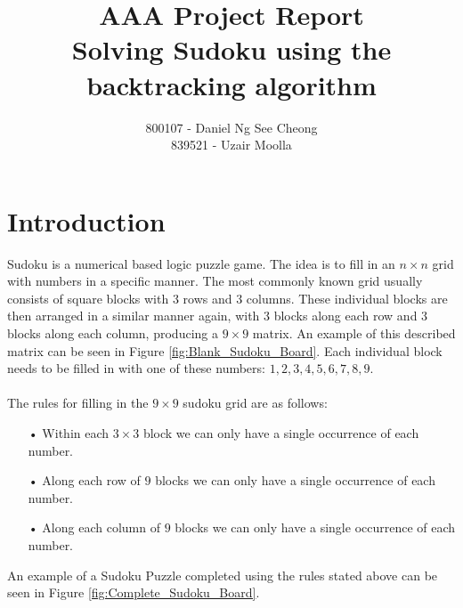 \documentclass[12pt,a4paper,titlepage]{article}
\author{800107 - Daniel Ng See Cheong\\
		839521 - Uzair Moolla}
\title{
	AAA Project Report\\
	\large Solving Sudoku using the backtracking algorithm
}
\begin{document}
\maketitle
\newpage
\tableofcontents
\newpage
\section{Introduction}

Sudoku is a numerical based logic puzzle game. The idea is to fill in an $n\times n$ grid with numbers in a specific manner. The most commonly known grid usually consists of square blocks with 3 rows and 3 columns. These individual blocks are then arranged in a similar manner again, with 3 blocks along each row and 3 blocks along each column, producing a $9 \times 9$ matrix. An example of this described matrix can be seen in Figure  \ref{fig:Blank_Sudoku_Board}. Each individual block needs to be filled in  with one of these numbers: ${1,2,3,4,5,6,7,8,9}$.
\\
\\
The rules for filling in the $9 \times 9$ sudoku grid are as follows:
\begin{itemize}
\item[•] Within each $3 \times 3 $ block we can only have a single occurrence of each number.
\item[•] Along each row of $9$ blocks we can only have a single occurrence of each number.
\item[•] Along each column of $9$ blocks we can only have a single occurrence of each number.
\end{itemize}

\noindent
An example of a Sudoku Puzzle completed using the rules stated above can be seen in Figure \ref{fig:Complete_Sudoku_Board}.
\end{document}
